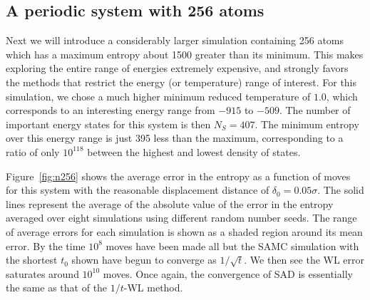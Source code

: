 \documentclass[letterpaper,twocolumn,amsmath,amssymb,pre,aps,10pt]{revtex4-1}
\begin{document}
\subsection{A periodic system with 256 atoms}
Next we will introduce a considerably larger simulation containing 256
atoms which has a maximum entropy about 1500 greater than its minimum.
This makes exploring the entire range of energies extremely expensive,
and strongly favors the methods that restrict the energy (or
temperature) range of interest.  For this simulation, we chose a much
higher minimum reduced temperature of $1.0$, which corresponds to an
interesting energy range from $-915$ to $-509$.  The number of
important energy states for this system is then $N_S = 407$.  The
minimum entropy over this energy range is just 395 less than the
maximum, corresponding to a ratio of only $10^{118}$ between the
highest and lowest density of states.


Figure~\ref{fig:n256} shows the average error in the entropy as a
function of moves for this system with the reasonable displacement
distance of $\delta_0 = 0.05\sigma$.  The solid lines represent the
average of the absolute value of the error in the entropy averaged
over eight simulations using different random number seeds.  The range
of average errors for each simulation is shown as a shaded region
around its mean error.  By the time $10^8$ moves have been made all
but the SAMC simulation with the shortest $t_0$ shown have begun to
converge as $1/\sqrt{t}$.  We then see the WL error saturates around
$10^{10}$ moves.  Once again, the convergence of SAD is essentially
the same as that of the $1/t$-WL method.



\end{document}
